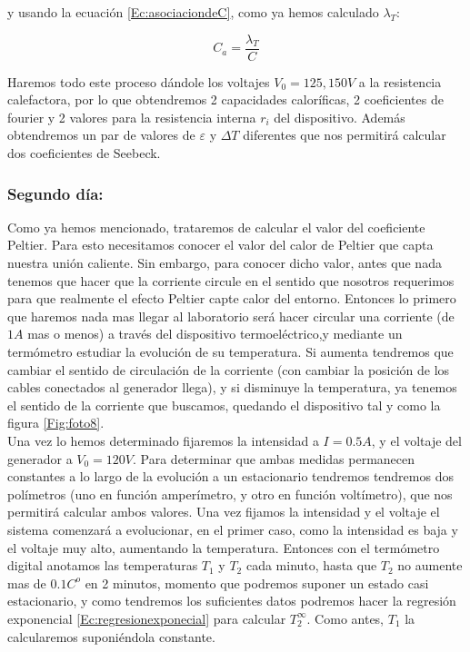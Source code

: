 \documentclass[12pt,a4paper]{article}
\begin{document}
y usando la ecuación \ref{Ec:asociaciondeC}, como ya hemos calculado $\lambda_T$:

\begin{equation}
C_a = \dfrac{\lambda_T}{C}
\end{equation}

Haremos todo este proceso dándole los voltajes $V_0=125,150 V$ a la resistencia calefactora, por lo que obtendremos 2 capacidades caloríficas, 2 coeficientes de fourier y 2 valores para la resistencia interna $r_i$ del dispositivo. Además obtendremos un par de valores de $\varepsilon$ y $\Delta T$ diferentes que nos permitirá calcular dos coeficientes de Seebeck. 


\subsubsection{Segundo día:}

Como ya hemos mencionado, trataremos de calcular el valor del coeficiente Peltier. Para esto necesitamos conocer el valor del calor de Peltier que capta nuestra unión caliente. Sin embargo, para conocer dicho valor, antes que nada tenemos que hacer que la corriente circule en el sentido que nosotros requerimos para que realmente el efecto Peltier capte calor del entorno. Entonces lo primero que haremos nada mas llegar al laboratorio será hacer circular una corriente (de $1A$ mas o menos) a través del dispositivo termoeléctrico,y mediante un termómetro estudiar la evolución de su temperatura. Si aumenta tendremos que cambiar el sentido de circulación de la corriente (con cambiar la posición de los cables conectados al generador llega), y si disminuye la temperatura, ya tenemos el sentido de la corriente que buscamos, quedando el dispositivo tal y como la figura \ref{Fig:foto8}. \\



Una vez lo hemos determinado fijaremos la intensidad a $I=0.5A$, y el voltaje del generador a $V_0 = 120 V$. Para determinar que ambas medidas permanecen constantes a lo largo de la evolución a un estacionario tendremos tendremos dos polímetros (uno en función amperímetro, y otro en función voltímetro), que nos permitirá calcular ambos valores. Una vez fijamos la intensidad y el voltaje el sistema comenzará a evolucionar, en el primer caso, como la intensidad es baja y el voltaje muy alto, aumentando la temperatura. Entonces con el termómetro digital anotamos las temperaturas $T_1$ y $T_2$ cada minuto, hasta que $T_2$ no aumente mas de $0.1 C^o$ en 2 minutos, momento que podremos suponer un estado casi estacionario, y como tendremos los suficientes datos podremos hacer la regresión exponencial \ref{Ec:regresionexponecial} para calcular $T_2^{\infty}$. Como antes, $T_1$ la calcularemos suponiéndola constante. \\
\end{document}
